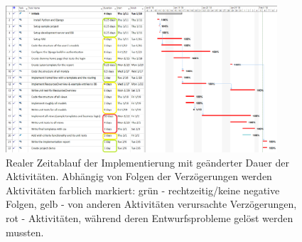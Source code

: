 \documentclass[parskip=full,11pt]{scrartcl}
\begin{document}
 \newpage
  \begin{figure}[h]
 	\centering
 	\includegraphics[width=0.9\textwidth]{res/gannt_real.png}
 	\caption{Realer Zeitablauf der Implementierung mit geänderter Dauer der Aktivitäten. Abhängig von Folgen der Verzögerungen werden Aktivitäten farblich markiert: grün - rechtzeitig/keine negative Folgen, gelb - von anderen Aktivitäten verursachte Verzögerungen, rot - Aktivitäten, während deren Entwurfsprobleme gelöst werden mussten.}
 \end{figure}
\end{document}
